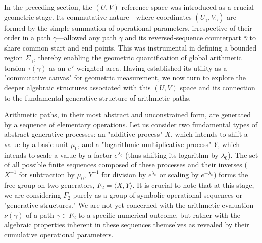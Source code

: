 In the preceding section, the $(U,V)$ reference space was introduced as a crucial geometric stage. Its commutative nature—where coordinates $(U_\gamma, V_\gamma)$ are formed by the simple summation of operational parameters, irrespective of their order in a path $\gamma$—allowed any path $\gamma$ and its reversed-sequence counterpart $\bar{\gamma}$ to share common start and end points. This was instrumental in defining a bounded region $\Sigma_\gamma$, thereby enabling the geometric quantification of global arithmetic torsion $\tau(\gamma)$ as an $e^V$-weighted area. Having established its utility as a "commutative canvas" for geometric measurement, we now turn to explore the deeper algebraic structures associated with this $(U,V)$ space and its connection to the fundamental generative structure of arithmetic paths.

Arithmetic paths, in their most abstract and unconstrained form, are generated by a sequence of elementary operations. Let us consider two fundamental types of abstract generative processes: an "additive process" $X$, which intends to shift a value by a basic unit $\mu_0$, and a "logarithmic multiplicative process" $Y$, which intends to scale a value by a factor $e^{\lambda_0}$ (thus shifting its logarithm by $\lambda_0$). The set of all possible finite sequences composed of these processes and their inverses ($X^{-1}$ for subtraction by $\mu_0$, $Y^{-1}$ for division by $e^{\lambda_0}$ or scaling by $e^{-\lambda_0}$) forms the free group on two generators, $F_2 = \langle X, Y \rangle$. It is crucial to note that at this stage, we are considering $F_2$ purely as a group of symbolic operational sequences or "generative structures." We are not yet concerned with the arithmetic evaluation $\nu(\gamma)$ of a path $\gamma \in F_2$ to a specific numerical outcome, but rather with the algebraic properties inherent in these sequences themselves as revealed by their cumulative operational parameters.

